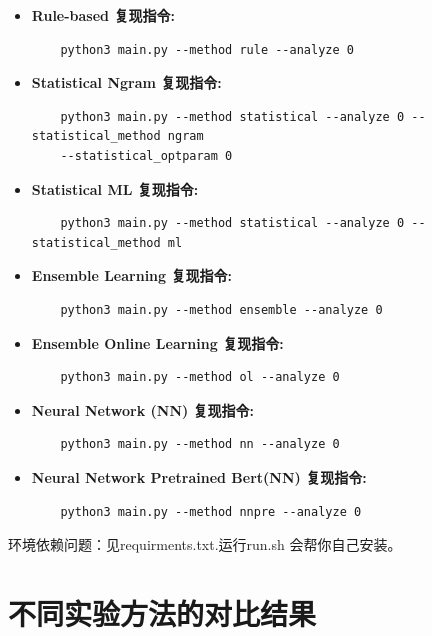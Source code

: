 \documentclass[answers]{exam}  %
\begin{document}
\begin{itemize}
    \item \textbf{Rule-based 复现指令:}
    \begin{lstlisting}
    python3 main.py --method rule --analyze 0  
    \end{lstlisting}

    \item \textbf{Statistical Ngram 复现指令:}
    \begin{lstlisting}
    python3 main.py --method statistical --analyze 0 --statistical_method ngram 
    --statistical_optparam 0
    \end{lstlisting}

    \item \textbf{Statistical ML 复现指令:}
    \begin{lstlisting}
    python3 main.py --method statistical --analyze 0 --statistical_method ml 
    \end{lstlisting}

    \item \textbf{Ensemble Learning 复现指令:}
    \begin{lstlisting}
    python3 main.py --method ensemble --analyze 0
    \end{lstlisting}

    \item \textbf{Ensemble Online Learning 复现指令:}
    \begin{lstlisting}
    python3 main.py --method ol --analyze 0
    \end{lstlisting}

    \item \textbf{Neural Network (NN) 复现指令:}
    \begin{lstlisting}
    python3 main.py --method nn --analyze 0 
    \end{lstlisting}


    \item \textbf{Neural Network Pretrained Bert(NN) 复现指令:}
    \begin{lstlisting}
    python3 main.py --method nnpre --analyze 0 
    \end{lstlisting}
\end{itemize}

环境依赖问题：见requirments.txt.运行run.sh 会帮你自己安装。


\section{不同实验方法的对比结果}
\end{document}
